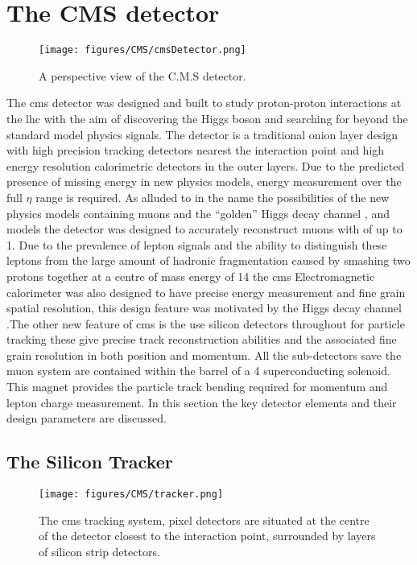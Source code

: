 \chapter{The CMS detector} %
\label{cha:the_cms_detector}
\begin{figure}[htbp]
  \centering
    \texttt{[image: figures/CMS/cmsDetector.png]}
  \caption{A perspective view of the C.M.S detector\cite{cms-sketchup}.}
  \label{fig:figures_CMS_cmsDetector}
\end{figure}

The \ac{cms} detector was designed and built to study proton-proton 
interactions at the \ac{lhc} with the aim of discovering the Higgs boson and 
searching for beyond the standard model physics signals. The detector is a 
traditional onion layer design with high precision tracking detectors nearest 
the interaction point and high energy resolution calorimetric detectors in the 
outer layers. Due to the predicted presence of missing energy \MET in new 
physics models, energy measurement over the full $\eta$ range is required. As 
alluded to in the name the possibilities of the new physics models containing 
muons and the ``golden'' Higgs decay channel 
\HepProcess{\PH\to\PZ\PZ\to\Pmu\Pmu\Pmu\Pmu}, and \PZprime models the detector 
was designed to accurately reconstruct muons with \PT of up to \unit{1}{\TeV}. 
Due to the prevalence of lepton signals and the ability to distinguish these 
leptons from the large amount of hadronic fragmentation caused by smashing two 
protons together at a centre of mass energy of \unit{14}{\TeV} the \ac{cms} 
Electromagnetic calorimeter was also designed to have precise energy 
measurement and fine grain spatial resolution, this design feature was motivated by the Higgs decay channel \HepProcess{\PH\to\Pphoton\Pphoton}.The 
other new feature of \ac{cms} is the use silicon detectors throughout for 
particle tracking these give precise track reconstruction abilities and the 
associated fine grain resolution in both position and momentum. All the 
sub-detectors save the muon system are contained within the barrel of a 
\unit{4}{\tesla} superconducting solenoid. This magnet provides the particle 
track bending required for momentum and lepton charge measurement. In this 
section the key detector elements and their design parameters are discussed.

\section{The Silicon Tracker} %
\label{sec:the_silicon_tracker}
\begin{figure}[htbp]
  \centering
    \texttt{[image: figures/CMS/tracker.png]}
  \caption{The \ac{cms} tracking system, pixel detectors are situated at the 
  centre of the detector closest to the interaction point, surrounded by layers 
  of silicon strip detectors\cite{cms-sketchup}.}
  \label{fig:figures_CMS_tracker}
\end{figure}


